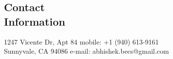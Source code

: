 \documentclass[margin,line]{resume}
\begin{document}
\begin{resume}

%

    \section{\mysidestyle Contact\\Information}

    1247 Vicente Dr, Apt 84                         \hfill mobile: +1 (940) 613-9161          \vspace{0mm}\\\vspace{0mm}%
    Sunnyvale, CA 94086      \hfill e-mail: abhishek.becs@gmail.com  \vspace{0mm}\\\vspace{-6mm}%



\end{resume}
\end{document}
